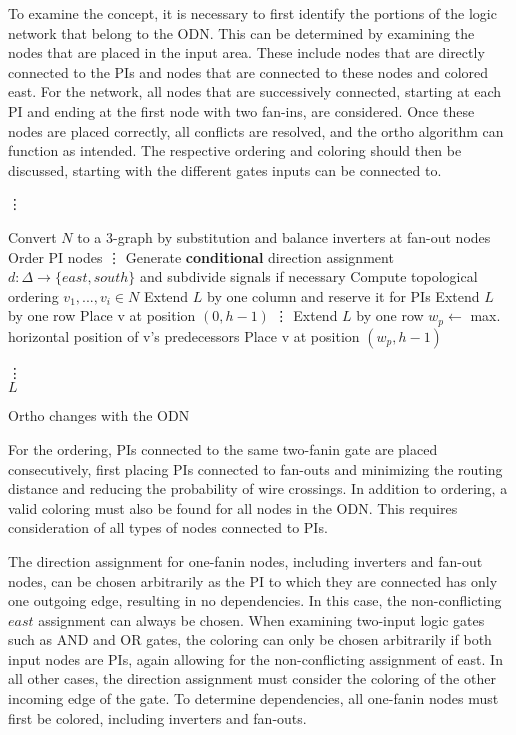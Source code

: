 To examine the concept, it is necessary to first identify the portions of the logic network that belong to the ODN. This can be determined by examining the nodes that are placed in the input area. These include nodes that are directly connected to the PIs and nodes that are connected to these nodes and colored east. For the network, all nodes that are successively connected, starting at each PI and ending at the first node with two fan-ins, are considered. Once these nodes are placed correctly, all conflicts are resolved, and the ortho algorithm can function as intended. The respective ordering and coloring should then be discussed, starting with the different gates inputs can be connected to.

\begin{algorithm}[H]
	\vdots
	
	\begin{algorithmic}
		\State Convert $N$ to a 3-graph by substitution and balance inverters at fan-out nodes
		\State Order PI nodes
		\State \vdots
		\State Generate \textbf{conditional} direction assignment $d : \Delta \rightarrow \{east, south\}$ and subdivide signals if necessary
		\State Compute topological ordering $v_1, . . . , v_i \in N$
		\State Extend $L$ by one column and reserve it for PIs
		\State Extend $L$ by one row
		\State Place v at position $(0, h - 1)$
		\State \vdots
		\State Extend $L$ by one row
		\EndIf
		\State $w_p \leftarrow$ max. horizontal position of v's predecessors
		\State Place v at position $(w _p, h - 1)$
		\EndIf
		
		\EndFor
		\State \vdots \\
		\Return $L$
	\end{algorithmic}
	\caption{Ortho changes with the ODN}\label{alg:input_network}
\end{algorithm}

For the ordering, PIs connected to the same two-fanin gate are placed consecutively, first placing PIs connected to fan-outs and minimizing the routing distance and reducing the probability of wire crossings. In addition to ordering, a valid coloring must also be found for all nodes in the ODN. This requires consideration of all types of nodes connected to PIs.

The direction assignment for one-fanin nodes, including inverters and fan-out nodes, can be chosen arbitrarily as the PI to which they are connected has only one outgoing edge, resulting in no dependencies. In this case, the non-conflicting $east$ assignment can always be chosen. When examining two-input logic gates such as AND and OR gates, the coloring can only be chosen arbitrarily if both input nodes are PIs, again allowing for the non-conflicting assignment of east. In all other cases, the direction assignment must consider the coloring of the other incoming edge of the gate. To determine dependencies, all one-fanin nodes must first be colored, including inverters and fan-outs.

